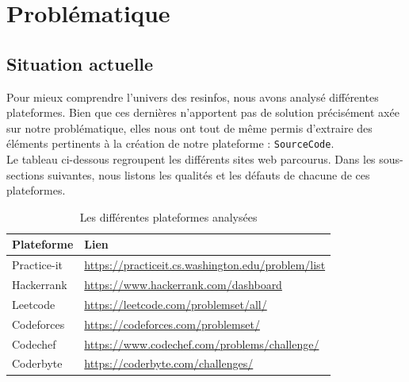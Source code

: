 \chapter{Problématique}
\section{Situation actuelle}

Pour mieux comprendre l'univers des \glspl{resinfo}, nous avons analysé différentes plateformes. Bien que ces dernières n'apportent pas de solution précisément axée sur notre problématique, elles nous ont tout de même permis d'extraire des éléments pertinents à la création de notre plateforme : \texttt{SourceCode}.\\

Le tableau ci-dessous regroupent les différents sites web parcourus. Dans les sous-sections suivantes, nous listons les qualités et les défauts de chacune de ces plateformes.\\

\begin{table}[H]
    \centering
    \begin{tabular}{| l | l |}
    \hline
        Plateforme & Lien \\
    \hline
        Practice-it &
        \href{https://practiceit.cs.washington.edu/problem/list}{https://practiceit.cs.washington.edu/problem/list} \\ 
    \hline
        Hackerrank &
        \href{https://www.hackerrank.com/dashboard}{https://www.hackerrank.com/dashboard} \\ 
    \hline
        Leetcode &
        \href{https://leetcode.com/problemset/all/}{https://leetcode.com/problemset/all/} \\ 
    \hline
        Codeforces &
        \href{https://codeforces.com/problemset/}{https://codeforces.com/problemset/} \\ 
    \hline
        Codechef &
        \href{https://www.codechef.com/problems/challenge/}{https://www.codechef.com/problems/challenge/} \\ 
    \hline
        Coderbyte &
        \href{https://coderbyte.com/challenges/}{https://coderbyte.com/challenges/} \\ 
    \hline
    \end{tabular}
    \caption{Les différentes plateformes analysées}
    \label{table:compPlateforme}
\end{table}

